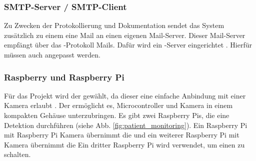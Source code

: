 \subsubsection{SMTP-Server / SMTP-Client}
Zu Zwecken der Protokollierung und Dokumentation sendet das System zusätzlich zu einem  eine Mail an einen eigenen Mail-Server. Dieser Mail-Server empfängt über das -Protokoll Mails. Dafür wird ein -Server eingerichtet \cite{Mailcow}. Hierfür müssen auch  angepasst werden.

\subsubsection{Raspberry und Raspberry Pi} \label{sec:raspi}
Für das Projekt wird der  gewählt, da dieser eine einfache Anbindung mit einer Kamera erlaubt \cite{Raspberry} \cite{Raspberry_camera}. Der  ermöglicht es, Microcontroller und Kamera in einem kompakten Gehäuse unterzubringen. Es gibt zwei Raspberry Pis, die eine Detektion durchführen (siehe Abb. \ref{fig:patient_monitoring}). Ein Raspberry Pi mit Raspberry Pi Kamera übernimmt die  und ein weiterer Raspberry Pi mit Kamera übernimmt die  Ein dritter Raspberry Pi wird verwendet, um einen  zu schalten.


